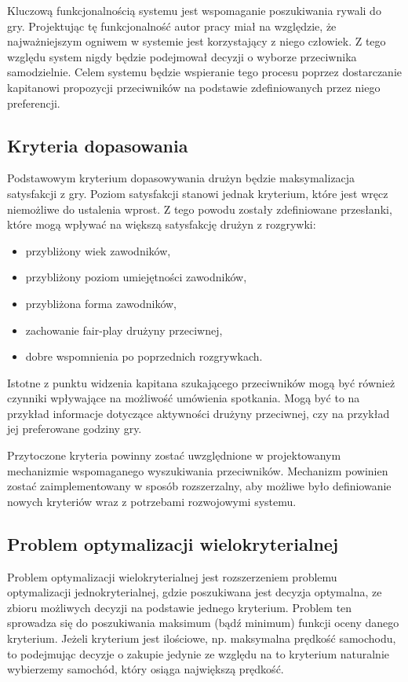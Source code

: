 Kluczową funkcjonalnością systemu jest wspomaganie poszukiwania rywali do gry. Projektując tę funkcjonalność autor pracy miał na względzie, że najważniejszym ogniwem w systemie jest korzystający z niego człowiek. Z tego względu system nigdy będzie podejmował decyzji o wyborze przeciwnika samodzielnie. Celem systemu będzie wspieranie tego procesu poprzez dostarczanie kapitanowi propozycji przeciwników na podstawie zdefiniowanych przez niego preferencji.


\subsection{Kryteria dopasowania}

Podstawowym kryterium dopasowywania drużyn będzie maksymalizacja satysfakcji z gry. Poziom satysfakcji stanowi jednak kryterium, które jest wręcz niemożliwe do ustalenia wprost. Z tego powodu zostały zdefiniowane przesłanki, które mogą wpływać na większą satysfakcję drużyn z rozgrywki:

\begin{itemize}
\item{przybliżony wiek zawodników,}
\item{przybliżony poziom umiejętności zawodników,}
\item{przybliżona forma zawodników,}
\item{zachowanie fair-play drużyny przeciwnej,}
\item{dobre wspomnienia po poprzednich rozgrywkach.}
\end{itemize}

Istotne z punktu widzenia kapitana szukającego przeciwników mogą być również czynniki wpływające na możliwość umówienia spotkania. Mogą być to na przykład informacje dotyczące aktywności drużyny przeciwnej, czy na przykład jej preferowane godziny gry.

Przytoczone kryteria powinny zostać uwzględnione w projektowanym mechanizmie wspomaganego wyszukiwania przeciwników. Mechanizm powinien zostać zaimplementowany w sposób rozszerzalny, aby możliwe było definiowanie nowych kryteriów wraz z potrzebami rozwojowymi systemu.

\subsection{Problem optymalizacji wielokryterialnej}

Problem optymalizacji wielokryterialnej jest rozszerzeniem problemu optymalizacji jednokryterialnej, gdzie poszukiwana jest decyzja optymalna, ze zbioru możliwych decyzji na podstawie jednego kryterium. Problem ten sprowadza się do poszukiwania maksimum (bądź minimum) funkcji oceny danego kryterium. Jeżeli kryterium jest ilościowe, np. maksymalna prędkość samochodu, to podejmując decyzje o zakupie jedynie ze względu na to kryterium naturalnie wybierzemy samochód, który osiąga największą prędkość. 

